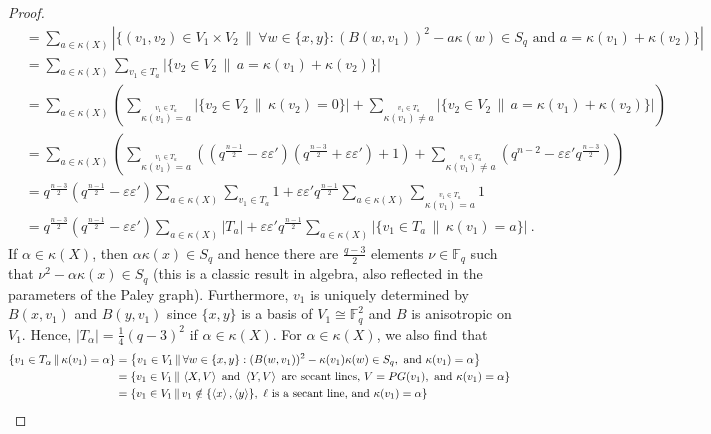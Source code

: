 \documentclass[a4paper]{article}
\theoremstyle{definition}
\newcommand{\eps}{\varepsilon}
\newcommand{\FF}{\mathbb F}
\newcommand{\vspan}[1]{\left \langle #1 \right \rangle}
\newcommand{\pg}{\textnormal{PG}}
\begin{document}
\begin{proof}
{\begin{align*}
        &=\sum_{a\in \kappa(X)}|\{(v_{1},v_{2})\in V_{1}\times V_{2}\, \| \,\forall w\in\{x,y\}:(B(w,v_{1}))^{2}-a\kappa(w)\in S_{q}\text{ and }
        a=\kappa(v_{1})+\kappa(v_{2})\}|\\
        &=\sum_{a\in \kappa(X)}\sum_{v_{1}\in T_{a}}|\{v_{2}\in  V_{2}\, \| \,
        a=\kappa(v_{1})+\kappa(v_{2})\}|\\
        &=\sum_{a\in \kappa(X)}\left(\sum_{\stackrel{v_{1}\in T_{a}}{\kappa(v_{1})=a}}|\{v_{2}\in  V_{2}\, \| \,
        \kappa(v_{2})=0\}|+\sum_{\stackrel{v_{1}\in T_{a}}{\kappa(v_{1})\neq a}}|\{v_{2}\in  V_{2}\, \| \,
        a=\kappa(v_{1})+\kappa(v_{2})\}|\right)\\
        &=\sum_{a\in \kappa(X)}\left(\sum_{\stackrel{v_{1}\in T_{a}}{\kappa(v_{1})=a}}\left(\left(q^{\frac{n-1}{2}}-\eps\eps'\right)\left(q^{\frac{n-3}{2}}+\eps\eps'\right)+1\right)+\sum_{\stackrel{v_{1}\in T_{a}}{\kappa(v_{1})\neq a}}\left(q^{n-2}-\eps\eps' q^{\frac{n-3}{2}}\right)\right)\\
        &=q^{\frac{n-3}{2}}\left(q^{\frac{n-1}{2}}-\eps\eps'\right)\sum_{a\in \kappa(X)}\sum_{v_{1}\in T_{a}}1+\eps\eps'q^{\frac{n-1}{2}}\sum_{a\in \kappa(X)}\sum_{\stackrel{v_{1}\in T_{a}}{\kappa(v_{1})=a}}1\\
        &=q^{\frac{n-3}{2}}\left(q^{\frac{n-1}{2}}-\eps\eps'\right)\sum_{a\in \kappa(X)}|T_{a}|+\eps\eps'q^{\frac{n-1}{2}}\sum_{a\in \kappa(X)}|\{v_{1}\in T_{a}\, \| \,\kappa(v_{1})=a\}|\:.
    \end{align*}}
    If $\alpha\in \kappa(X)$, then $\alpha\kappa(x)\in S_{q}$ and hence there are $\frac{q-3}{2}$ elements $\nu\in\FF_q$ such that $\nu^{2}-\alpha\kappa(x)\in S_{q}$ (this is a classic result in algebra, also reflected in the parameters of the Paley graph). 
    Furthermore, $v_{1}$ is uniquely determined by $B(x,v_{1})$ and $B(y,v_{1})$ since $\{x,y\}$ is a basis of $V_{1}\cong\FF^{2}_{q}$ and $B$ is anisotropic on $V_{1}$. Hence, $|T_{\alpha}|=\frac{1}{4}(q-3)^{2}$ if $\alpha\in \kappa(X)$. For $\alpha\in \kappa(X)$, we also find that
    \begin{align*}
        \left\{v_{1}\in T_{\alpha}\, \| \,\kappa(v_{1})=\alpha\right\}&=\left\{v_{1}\in V_{1}\, \| \, \forall w\in\{x,y\}:(B(w,v_{1}))^{2}-\kappa(v_{1})\kappa(w)\in S_{q},\text{ and }\kappa(v_{1})=\alpha\right\}\\
        &=\left\{v_{1}\in V_{1}\, \| \, \vspan{X,V}\text{ and }\vspan{Y,V}\text{ are secant lines, }V=\pg(v_{1}),\text{ and }\kappa(v_{1})=\alpha\right\}\\
        &=\left\{v_{1}\in V_{1}\, \| \, v_{1}\notin\{\vspan{x},\vspan{y}\},\ \ell\text{ is a secant line, and }\kappa(v_{1})=\alpha\right\}\\

\end{align*}
\end{proof}
\end{document}

